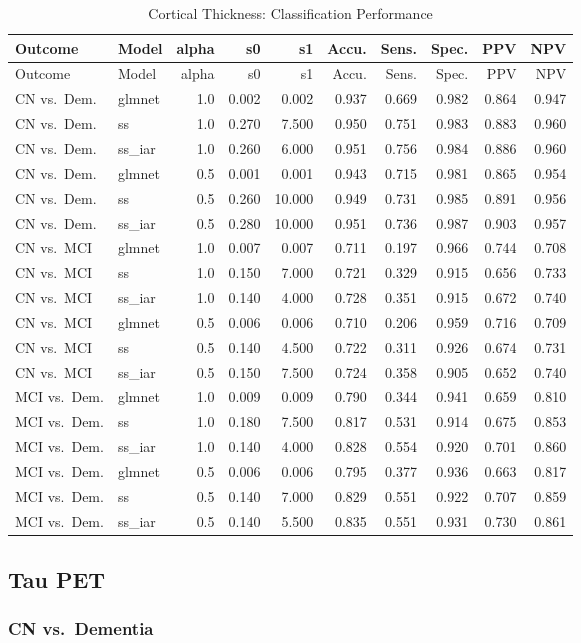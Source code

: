 \documentclass[
]{article}
\begin{document}
\begin{longtable}[]{@{}llrrrrrrrr@{}}
\caption{Cortical Thickness: Classification Performance}\tabularnewline
\toprule
Outcome & Model & alpha & s0 & s1 & Accu. & Sens. & Spec. & PPV &
NPV\tabularnewline
\midrule
\endfirsthead
\toprule
Outcome & Model & alpha & s0 & s1 & Accu. & Sens. & Spec. & PPV &
NPV\tabularnewline
\midrule
\endhead
CN vs.~Dem. & glmnet & 1.0 & 0.002 & 0.002 & 0.937 & 0.669 & 0.982 &
0.864 & 0.947\tabularnewline
CN vs.~Dem. & ss & 1.0 & 0.270 & 7.500 & 0.950 & 0.751 & 0.983 & 0.883 &
0.960\tabularnewline
CN vs.~Dem. & ss\_iar & 1.0 & 0.260 & 6.000 & 0.951 & 0.756 & 0.984 &
0.886 & 0.960\tabularnewline
CN vs.~Dem. & glmnet & 0.5 & 0.001 & 0.001 & 0.943 & 0.715 & 0.981 &
0.865 & 0.954\tabularnewline
CN vs.~Dem. & ss & 0.5 & 0.260 & 10.000 & 0.949 & 0.731 & 0.985 & 0.891
& 0.956\tabularnewline
CN vs.~Dem. & ss\_iar & 0.5 & 0.280 & 10.000 & 0.951 & 0.736 & 0.987 &
0.903 & 0.957\tabularnewline
CN vs.~MCI & glmnet & 1.0 & 0.007 & 0.007 & 0.711 & 0.197 & 0.966 &
0.744 & 0.708\tabularnewline
CN vs.~MCI & ss & 1.0 & 0.150 & 7.000 & 0.721 & 0.329 & 0.915 & 0.656 &
0.733\tabularnewline
CN vs.~MCI & ss\_iar & 1.0 & 0.140 & 4.000 & 0.728 & 0.351 & 0.915 &
0.672 & 0.740\tabularnewline
CN vs.~MCI & glmnet & 0.5 & 0.006 & 0.006 & 0.710 & 0.206 & 0.959 &
0.716 & 0.709\tabularnewline
CN vs.~MCI & ss & 0.5 & 0.140 & 4.500 & 0.722 & 0.311 & 0.926 & 0.674 &
0.731\tabularnewline
CN vs.~MCI & ss\_iar & 0.5 & 0.150 & 7.500 & 0.724 & 0.358 & 0.905 &
0.652 & 0.740\tabularnewline
MCI vs.~Dem. & glmnet & 1.0 & 0.009 & 0.009 & 0.790 & 0.344 & 0.941 &
0.659 & 0.810\tabularnewline
MCI vs.~Dem. & ss & 1.0 & 0.180 & 7.500 & 0.817 & 0.531 & 0.914 & 0.675
& 0.853\tabularnewline
MCI vs.~Dem. & ss\_iar & 1.0 & 0.140 & 4.000 & 0.828 & 0.554 & 0.920 &
0.701 & 0.860\tabularnewline
MCI vs.~Dem. & glmnet & 0.5 & 0.006 & 0.006 & 0.795 & 0.377 & 0.936 &
0.663 & 0.817\tabularnewline
MCI vs.~Dem. & ss & 0.5 & 0.140 & 7.000 & 0.829 & 0.551 & 0.922 & 0.707
& 0.859\tabularnewline
MCI vs.~Dem. & ss\_iar & 0.5 & 0.140 & 5.500 & 0.835 & 0.551 & 0.931 &
0.730 & 0.861\tabularnewline
\bottomrule
\end{longtable}

\hypertarget{tau-pet-1}{%
\subsection{Tau PET}\label{tau-pet-1}}

\hypertarget{cn-vs.-dementia-1}{%
\subsubsection{CN vs.~Dementia}\label{cn-vs.-dementia-1}}
\end{document}

